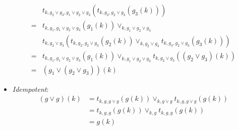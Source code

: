 \documentclass{article}
\begin{document}
\begin{itemize}
\begin{align*}
               & t_{k, g_2 \vee g_3, g_1 \vee g_2 \vee g_3}(t_{k, g_3, g_2 \vee g_3}(g_3(k))) \\
              =& t_{k, g_1, g_1 \vee g_2 \vee g_3}(g_1(k)) \vee_{k, g_1 \vee g_2 \vee g_3} \\
               & t_{k, g_2 \vee g_3}(t_{k, g_2, g_2 \vee g_3}(g_2(k)) \vee_{k, g_2 \vee g_3} t_{k, g_3, g_2 \vee g_3}(g_3(k))) \\
              =& t_{k, g_1, g_1 \vee g_2 \vee g_3}(g_1(k)) \vee_{k, g_1 \vee g_2 \vee g_3} t_{k, g_2 \vee g_3}((g_2 \vee g_3)(k)) \\
              =& (g_1 \vee (g_2 \vee g_3))(k)
            \end{align*}
          \item \emph{Idempotent}:
            \begin{align*}
              (g \vee g)(k) &= t_{k, g, g \vee g}(g(k)) \vee_{k, g \vee g} t_{k, g, g \vee g}(g(k)) \\
              &= t_{k, g, g}(g(k)) \vee_{k, g} t_{k, g, g}(g(k)) \\
              &= g(k)
            \end{align*}
        \end{itemize}
\end{document}
